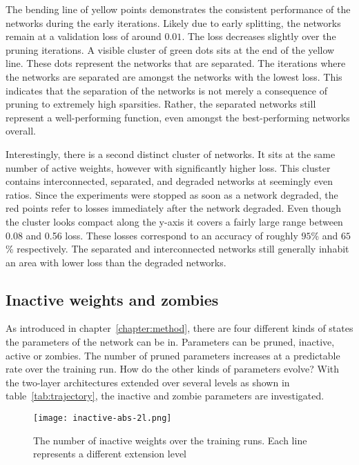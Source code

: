 The bending line of yellow points demonstrates the consistent performance of the networks during the early iterations.
Likely due to early splitting, the networks remain at a validation loss of around $0.01$.
The loss decreases slightly over the pruning iterations.
A visible cluster of green dots sits at the end of the yellow line.
These dots represent the networks that are separated.
The iterations where the networks are separated are amongst the networks with the lowest loss.
This indicates that the separation of the networks is not merely a consequence of pruning to extremely high sparsities.
Rather, the separated networks still represent a well-performing function, even amongst the best-performing networks overall.

Interestingly, there is a second distinct cluster of networks.
It sits at the same number of active weights, however with significantly higher loss.
This cluster contains interconnected, separated, and degraded networks at seemingly even ratios.
Since the experiments were stopped as soon as a network degraded, the red points refer to losses immediately after the network degraded.
Even though the cluster looks compact along the y-axis it covers a fairly large range between 0.08 and 0.56 loss. These losses correspond to an accuracy of roughly $95$\% and $65$\% respectively.
The separated and interconnected networks still generally inhabit an area with lower loss than the degraded networks.

\subsection{Inactive weights and zombies}
As introduced in chapter~\ref{chapter:method}, there are four different kinds of states the parameters of the network can be in.
Parameters can be pruned, inactive, active or zombies.
The number of pruned parameters increases at a predictable rate over the training run.
How do the other kinds of parameters evolve?
With the two-layer architectures extended over several levels as shown in table~\ref{tab:trajectory}, the inactive and zombie parameters are investigated.

\begin{figure}[ht]
    \centering
    \texttt{[image: inactive-abs-2l.png]}
    \caption{
        The number of inactive weights over the training runs. Each line represents a different extension level
    }\label{fig:inactive-abs}
\end{figure}


